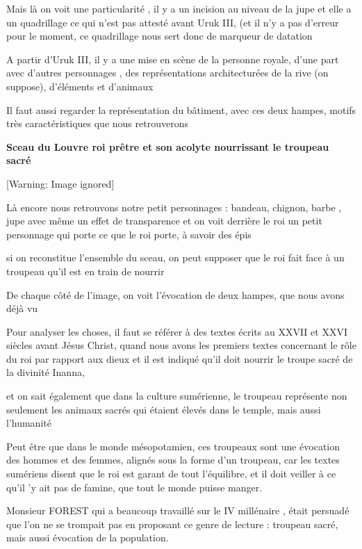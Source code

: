 \documentclass[a4paper,10pt]{article}
\newcommand{\DirImg}{../img/FaivreMartin/}
\begin{document}
Mais là on voit une particularité , il y a un incision au niveau de la
jupe et elle a un quadrillage ce qui n'est pas attesté
avant Uruk III, (et il n'y a pas
d'erreur pour le moment, ce quadrillage nous sert donc
de marqueur de datation

A partir d'Uruk III, il y a une mise en scène de la
personne royale, d'une part avec
d'autres personnages , des représentations
architecturées de la rive (on suppose), d'éléments et
d'animaux

Il faut aussi regarder la représentation du bâtiment, avec ces deux
hampes, motifs très caractéristiques que nous retrouverons

\textbf{Sceau du Louvre  roi prêtre et son acolyte nourrissant le
troupeau sacré}

  [Warning: Image ignored] %
 

Là encore nous retrouvons notre petit personnages  : bandeau, chignon,
barbe , jupe avec même un effet de transparence et on voit derrière le
roi un petit personnage qui porte ce que le roi porte, à savoir des
épis

si on reconstitue l'ensemble du sceau,  on peut
supposer que le roi fait face à un troupeau qu'il est
en train de nourrir

De chaque côté de l'image, on voit
l'évocation de deux hampes, que nous avons déjà vu

Pour analyser les choses, il faut se référer à des textes écrits au
XXVII et XXVI siècles avant Jésus Christ, quand nous avons les premiers
textes concernant le rôle du roi par rapport aux dieux et il est
indiqué qu'il doit nourrir le troupe sacré de la
divinité Inanna, 

et on sait également que dans la culture sumérienne, le troupeau
représente non seulement les animaux sacrés qui étaient élevés dans le
temple, mais aussi l'humanité

Peut être que dans le monde mésopotamien, ces troupeaux sont une
évocation des hommes et des femmes, alignés sous la forme
d'un troupeau, car les textes sumériens disent que le
roi est garant de tout l'équilibre, et il doit veiller
à ce qu'il 'y ait pas de famine, que
tout le monde puisse manger.

Monsieur FOREST qui a beaucoup travaillé sur le IV millénaire , était
persuadé que l'on ne se trompait pas en proposant ce
genre de lecture : troupeau sacré, mais aussi évocation de la
population.
\end{document}
